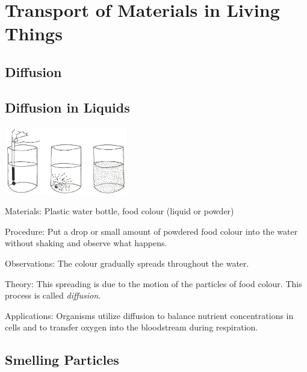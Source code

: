 \section{Transport of Materials in Living Things}

\begin{multicols}{2}


\section*{Diffusion}


\subsection{Diffusion in Liquids}

\begin{center}
\includegraphics[width=0.4\textwidth]{./img/vso/diffusion.jpg}
\end{center}

\begin{description*}
\item[Materials:]{Plastic water bottle, food colour (liquid or powder)}
\item[Procedure:]{Put a drop or small amount of powdered food colour into the water without shaking and observe what happens.}
\item[Observations:]{The colour gradually spreads throughout the water.}
\item[Theory:]{This spreading is due to the motion of the particles of food colour. This process is called \emph{diffusion}.}
\item[Applications:]{Organisms utilize diffusion to balance nutrient concentrations in cells and to transfer oxygen into the bloodstream during respiration.}
\end{description*}

\subsection{Smelling Particles}


\end{multicols}
